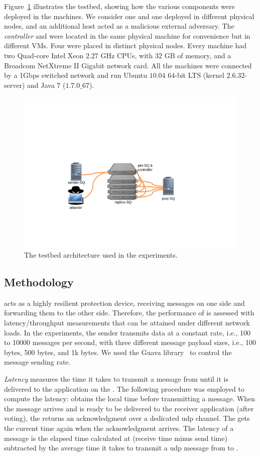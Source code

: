 Figure~\ref{fig:testbed} illustrates the testbed, showing how the various \sieveq components were deployed in the machines.
We consider one \sender and one \postsieve deployed in different physical nodes, and an additional host acted as a malicious external adversary.
The \emph{controller} and \presieves were located in the same physical machine for convenience but in different VMs.
Four \repsieves were placed in distinct physical nodes.
Every machine had two Quad-core Intel Xeon $2.27$ GHz CPUs, with $32$ GB of memory, and a Broadcom NetXtreme II Gigabit network card.
All the machines were connected by a 1Gbps switched network and run Ubuntu $10.04$ $64$-bit LTS (kernel $2.6.32$-server) and Java $7$ ($1.7.0\_67$).


\begin{figure}[t]
\includegraphics[width=0.8\columnwidth]{images/images/testbed1.pdf}
\caption{The \sieveq testbed architecture used in the experiments.}
\label{fig:testbed}
\end{figure}


\subsection{Methodology}

\sieveq acts as a highly resilient protection device, receiving messages on one side and forwarding them to the other side.
Therefore, the performance of \sieveq is assessed with latency/throughput measurements that can be attained under different network loads. 
In the experiments, the sender transmits data at a constant rate, i.e., 100 to 10000 messages per second, with three different message payload sizes, i.e., 100 bytes, 500 bytes, and 1k bytes.
We used the Guava library~\cite{guava} to control the message sending rate.


\emph{Latency} measures the time it takes to transmit a message from \sender until it is delivered to the application on the \postsieve. 
The following procedure was employed to compute the latency: \sender obtains the local time before transmitting a message. 
When the message arrives and is ready to be delivered to the receiver application (after voting), the \postsieve returns an acknowledgment over a dedicated \gls{udp} channel.
The \Sender gets the current time again when the acknowledgment arrives. 
The latency of a message is the elapsed time calculated at \sender (receive time minus send time) subtracted by the average time it takes to transmit a \gls{udp} message from \postsieve to \sender.

